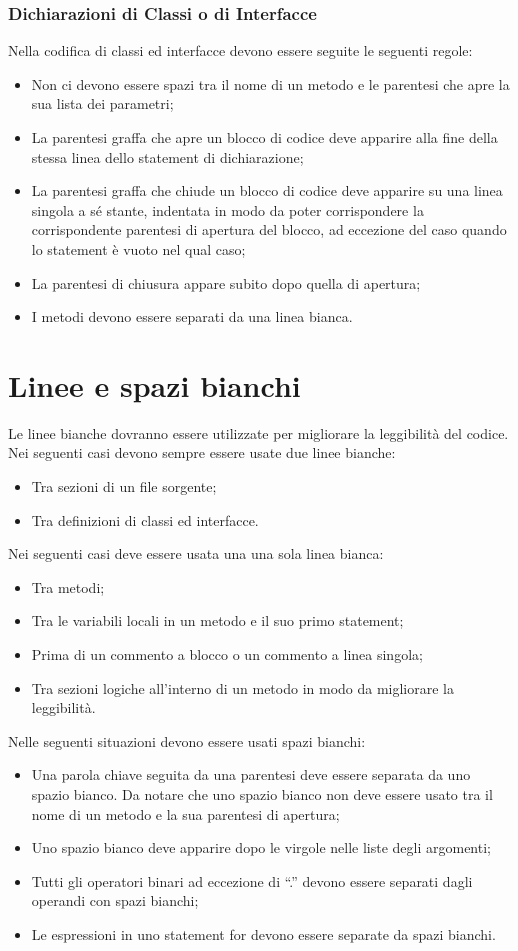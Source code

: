 \documentclass[11pt,titlepage,a4paper]{report}
\begin{document}
\subsection{Dichiarazioni di Classi o di Interfacce}
Nella codifica di classi ed interfacce devono essere seguite le seguenti regole:
\begin{itemize}
\item Non ci devono essere spazi tra il nome di un metodo e le parentesi che apre la sua lista dei parametri;
\item La parentesi graffa che apre un blocco di codice deve apparire alla fine della stessa linea dello statement di dichiarazione;
\item La parentesi graffa che chiude un blocco di codice deve apparire su una linea singola a sé stante, indentata in modo da poter corrispondere la corrispondente parentesi di apertura del blocco, ad eccezione del caso quando lo statement è vuoto nel qual caso;
\item La parentesi di chiusura appare subito dopo quella di apertura;
\item I metodi devono essere separati da una linea bianca.
\end{itemize}

\chapter{Linee e spazi bianchi}
Le linee bianche dovranno essere utilizzate per migliorare la leggibilit\`a del codice. Nei seguenti casi devono sempre essere usate due linee bianche:
\begin{itemize}
\item Tra sezioni di un file sorgente;
\item Tra definizioni di classi ed interfacce.
\end{itemize}
Nei seguenti casi deve essere usata una una sola linea bianca:
\begin{itemize}
\item Tra metodi;
\item Tra le variabili locali in un metodo e il suo primo statement;
\item Prima di un commento a blocco o un commento a linea singola;
\item Tra sezioni logiche all'interno di un metodo in modo da migliorare la leggibilità.
\end{itemize}
Nelle seguenti situazioni devono essere usati spazi bianchi:
\begin{itemize}
\item Una parola chiave seguita da una parentesi deve essere separata da uno spazio bianco. Da notare che uno spazio bianco non deve essere usato tra il nome di un metodo e la sua parentesi di apertura;
\item Uno spazio bianco deve apparire dopo le virgole nelle liste degli argomenti;
\item Tutti gli operatori binari ad eccezione di “.” devono essere separati dagli operandi con spazi bianchi;
\item Le espressioni in uno statement for devono essere separate da spazi bianchi.
\end{itemize}
\end{document}
